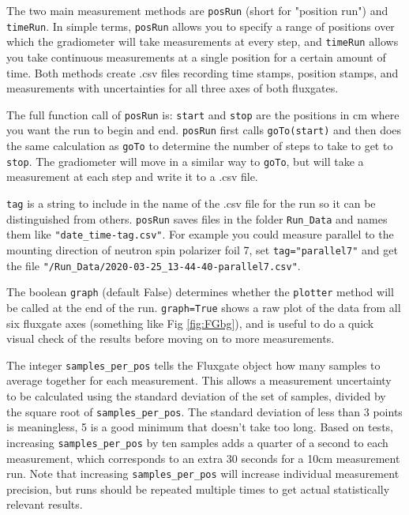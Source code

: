 \documentclass{TheMartianReport}
\newcommand{\pyinline}[1]{\texttt{#1}}
\newcommand{\pyline}[1]{\mint[bgcolor=LightGrey]{python}{#1}}
\newcommand{\shellinline}[1]{\texttt{#1}}
\begin{document}

The two main measurement methods are \pyinline{posRun} (short for "position run") and \pyinline{timeRun}. In simple terms, \pyinline{posRun} allows you to specify a range of positions over which the gradiometer will take measurements at every step, and \pyinline{timeRun} allows you take continuous measurements at a single position for a certain amount of time. Both methods create .csv files recording time stamps, position stamps, and measurements with uncertainties for all three axes of both fluxgates.

The full function call of \pyinline{posRun} is:
\pyline{posRun(start,stop,tag,graph=False,samples_per_pos=5)}
\pyinline{start} and \pyinline{stop} are the positions in cm where you want the run to begin and end. \pyinline{posRun} first calls \pyinline{goTo(start)} and then does the same calculation as \pyinline{goTo} to determine the number of steps to take to get to \pyinline{stop}. The gradiometer will move in a similar way to \pyinline{goTo}, but will take a measurement at each step and write it to a .csv file.

\pyinline{tag} is a string to include in the name of the .csv file for the run so it can be distinguished from others. \pyinline{posRun} saves files in the folder \shellinline{Run_Data} and names them like \shellinline{"date_time-tag.csv"}. For example you could measure parallel to the mounting direction of neutron spin polarizer foil 7, set \pyinline{tag="parallel7"} and get the file \pyinline{"/Run_Data/2020-03-25_13-44-40-parallel7.csv"}.

The boolean \pyinline{graph} (default False) determines whether the \pyinline{plotter} method will be called at the end of the run. \pyinline{graph=True} shows a raw plot of the data from all six fluxgate axes (something like Fig \ref{fig:FGbg}), and is useful to do a quick visual check of the results before moving on to more measurements.

The integer \pyinline{samples_per_pos} tells the Fluxgate object how many samples to average together for each measurement. This allows a measurement uncertainty to be calculated using the standard deviation of the set of samples, divided by the square root of \pyinline{samples_per_pos}. The standard deviation of less than 3 points is meaningless, 5 is a good minimum that doesn't take too long. Based on tests, increasing \pyinline{samples_per_pos} by ten samples adds a quarter of a second to each measurement, which corresponds to an extra 30 seconds for a 10cm measurement run. Note that increasing \pyinline{samples_per_pos} will increase individual measurement precision, but runs should be repeated multiple times to get actual statistically relevant results.
\end{document}
